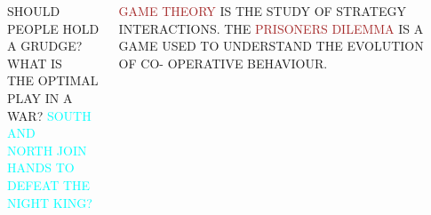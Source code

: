 \documentclass[usenames,dvipsnames,t]{beamer}
\begin{document}
\begin{frame}[fragile]
\begin{columns}[t]
 \begin{column}{.53\linewidth}

  \Huge{\textcolor{solarizedRed}{SHOULD PEOPLE HOLD A GRUDGE?} \textcolor{OliveGreen}{WHAT IS}\\
  \textcolor{OliveGreen}{THE OPTIMAL PLAY IN A WAR?} \textcolor{cyan}{SOUTH AND}\\
  \textcolor{cyan}{NORTH JOIN HANDS TO DEFEAT THE NIGHT
  KING?}}
  \end{column}
  \begin{column}{.22\linewidth}
 
  \Large{\textcolor{brown}{GAME THEORY} IS THE STUDY OF STRATEGY INTERACTIONS. THE \textcolor{brown}{PRISONERS DILEMMA} IS A GAME USED TO UNDERSTAND THE EVOLUTION OF CO- OPERATIVE BEHAVIOUR.}
  \end{column}
  \begin{column}{.20\linewidth}

  
  \end{column}
  \end{columns}
  \begin{columns}[t]
\end{columns}
\end{frame}
\end{document}
